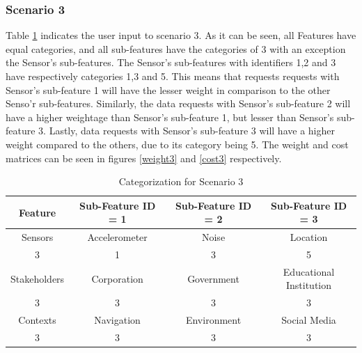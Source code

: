 \subsubsection{Scenario 3}
Table \ref{tab:scenario3} indicates the user input to scenario 3. As it can be seen, all Features have equal categories, and
all sub-features have the categories of 3 with an exception the  Sensor's sub-features. The Sensor's sub-features with identifiers 1,2 and 3 have respectively categories 1,3 and 5. This means that requests requests with Sensor's sub-feature 1 will have the lesser weight in comparison to the other Senso'r sub-features. Similarly, the data requests
with Sensor's sub-feature 2 will have a higher weightage than Sensor's sub-feature 1, but lesser than Sensor's sub-feature 3. Lastly, data requests with Sensor's sub-feature 3 will have a higher weight compared to the others, due to its category being 5. The weight and cost matrices can be seen in figures \ref{weight3} and \ref{cost3} respectively.

\begin{table}[h!]
  \centering
  \caption{Categorization for Scenario 3}
  \label{tab:scenario3}
  \begin{tabular}{cccc}
    \toprule
    Feature & Sub-Feature ID = 1 & Sub-Feature ID = 2 & Sub-Feature ID = 3\\
    \midrule
    Sensors & Accelerometer & Noise & Location\\
     3 & 1 & 3 & 5\\ \hhline{====}
     Stakeholders & Corporation & Government & Educational Institution\\
     3 & 3 & 3 & 3\\ \hhline{====}
     Contexts & Navigation & Environment & Social Media\\
     3 & 3 & 3 & 3\\ 
    \bottomrule
  \end{tabular}
\end{table}

